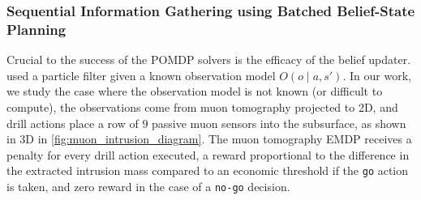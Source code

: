 \subsubsection{Sequential Information Gathering using Batched Belief-State Planning}

Crucial to the success of the POMDP solvers is the efficacy of the belief updater.
\textcite{mern2021improved} used a particle filter given a known observation model $O(o \mid a, s')$.
In our work, we study the case where the observation model is not known (or difficult to compute), the observations come from muon tomography projected to 2D, and drill actions place a row of $9$ passive muon sensors into the subsurface, as shown in 3D in \cref{fig:muon_intrusion_diagram}.
The muon tomography EMDP receives a penalty for every drill action executed, a reward proportional to the difference in the extracted intrusion mass compared to an economic threshold if the \texttt{go} action is taken, and zero reward in the case of a \texttt{no-go} decision.


